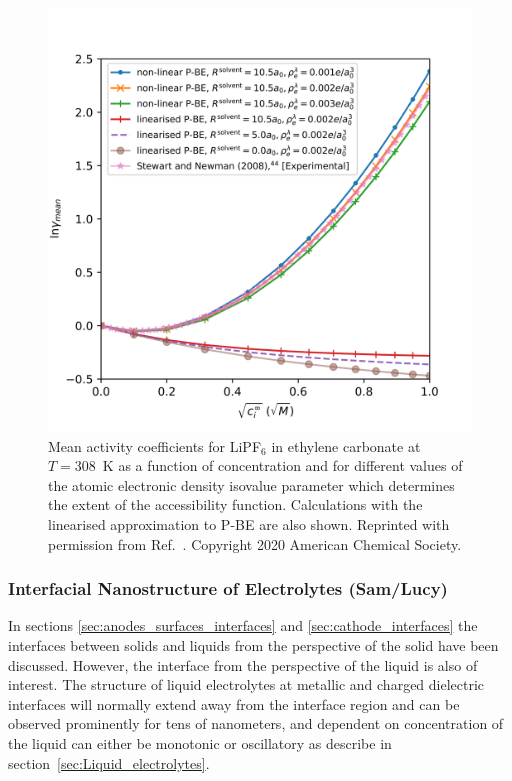 \documentclass[../main.tex]{subfiles}
\begin{document}
\begin{figure}
    \includegraphics[scale=0.8]{figures/lipf6.png}
    \caption{Mean activity coefficients for LiPF$_6$ in ethylene carbonate at $T=308$~K as a function of concentration and for different values of the atomic electronic density isovalue parameter which determines the extent of the accessibility function. Calculations with the linearised approximation to P-BE are also shown. Reprinted with permission from Ref.~. Copyright 2020 American Chemical Society.}
    \label{fig:ac}
\end{figure}

\subsubsection{Interfacial Nanostructure of Electrolytes (Sam/Lucy)}
In sections \ref{sec:anodes_surfaces_interfaces} and \ref{sec:cathode_interfaces} the interfaces between solids and liquids from the perspective of the solid have been discussed. However, the interface from the perspective of the liquid is also of interest. The structure of liquid electrolytes at metallic\cite{merlet_simulating_2013} and charged dielectric\cite{smith_electrostatic_2016} interfaces will normally extend away from the interface region and can be observed prominently for tens of nanometers, and dependent on concentration of the liquid can either be monotonic or oscillatory as describe in section~\ref{sec:Liquid_electrolytes}.
\end{document}
